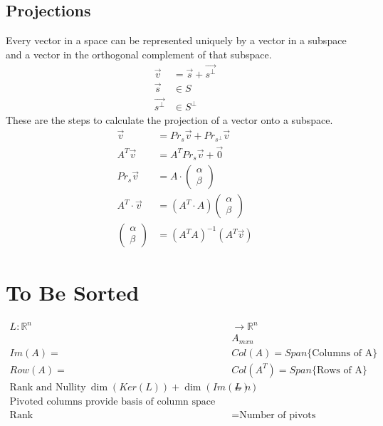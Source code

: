 \documentclass[12pt]{article}
\begin{document}
\subsection{Projections}
Every vector in a space can be represented uniquely by a vector in a subspace and a vector in the orthogonal complement of that subspace.
\begin{align}
  \vec{v} &= \vec{s} + \vec{s^\perp}\\
  \vec{s} &\in S\\
  \vec{s^\perp} &\in S^\perp
\end{align}
These are the steps to calculate the projection of a vector onto a subspace.
\begin{align}
  \vec{v} &= Pr_s\vec{v} + Pr_{s^\perp}\vec{v}\\
  A^T\vec{v} &= A^TPr_s\vec{v}+\vec{0}\\
  Pr_s\vec{v} &= A\cdot\left(\begin{array}{c}
    \alpha \\ \beta
  \end{array}\right)\\
  A^T \cdot \vec{v} &= \left(A^T \cdot A\right) \left( \begin{array}{c}
    \alpha \\ \beta
  \end{array}\right)\\
  \left(\begin{array}{c}
    \alpha \\ \beta
  \end{array}\right) &= {\left(A^TA\right)}^{-1}\left(A^T\vec{v}\right)
\end{align}
\section{To Be Sorted}
\begin{align}
  L:\mathbb{R}^n&\rightarrow\mathbb{R}^n\\
  &A_{mxn}\\
  Im\left(A\right) = &Col\left(A\right) = Span\{\text{Columns of A}\}\\
  Row\left(A\right) = &Col\left(A^T\right) = Span\{\text{Rows of A}\}\\
  \text{Rank and Nullity}\ \dim\left(Ker\left(L\right)\right) + \dim\left(Im\left(L\right)\right) &= n\\
  \text{Pivoted columns provide basis of column space}&\\
  \text{Rank} &= \text{Number of pivots}
\end{align}
\end{document}

